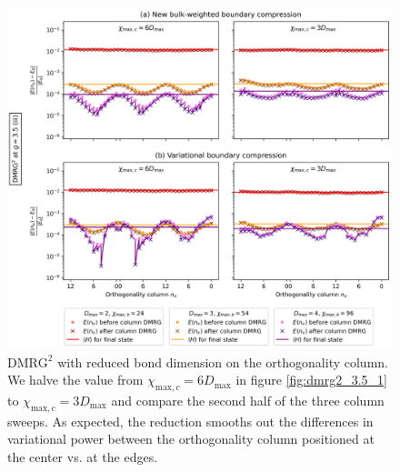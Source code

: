 \newpage
\vspace*{\fill}
\begin{figure}[H]
  \centering
  \includegraphics[width=1.0\linewidth]{dmrg_6_6_3.5_3.png}
  \caption{$\text{DMRG}^2$ with reduced bond dimension on the orthogonality column. We halve the value from $\chi_{\text{max}, c} = 6D_{\text{max}}$ in figure \ref{fig:dmrg2_3.5_1} to $\chi_{\text{max}, c} = 3D_{\text{max}}$ and compare the second half of the three column sweeps. As expected, the reduction smooths out the differences in variational power between the orthogonality column positioned at the center vs. at the edges.}
\label{fig:dmrg2_3.5_3}
\end{figure}
\vspace*{\fill}

